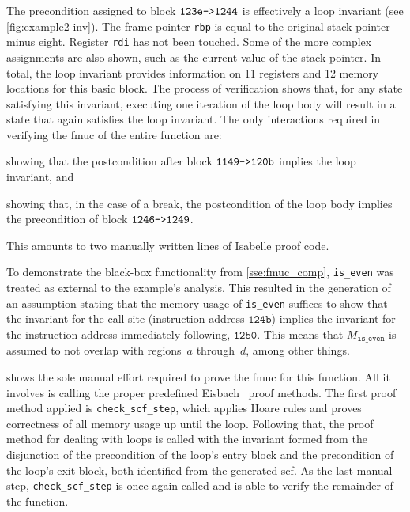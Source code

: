 The precondition assigned to block $\mathtt{123e\texttt{->}1244}$%
is effectively a loop invariant (see \cref{fig:example2-inv}).%
The frame pointer \lstinline|rbp|%
is equal to the original stack pointer minus eight.%
Register \lstinline|rdi| has not been touched.
Some of the more complex assignments are also shown,
such as the current value of the stack pointer.
In total, the loop invariant provides information
on 11 registers and 12 memory locations for this basic block.%
The process of verification shows that,
for any state satisfying this invariant,
executing one iteration of the loop body
will result in a state that again satisfies the loop invariant.
The only interactions required in verifying the \ac{fmuc} of the entire function are:
\begin{enumerate*}
  \item showing that the postcondition after block $\mathtt{1149\texttt{->}120b}$%
  implies the loop invariant, and
  \item showing that, in the case of a break, the postcondition of the loop body%
  implies the precondition of block $\mathtt{1246\texttt{->}1249}$.
\end{enumerate*}
This amounts to two manually written lines of Isabelle proof code.  

To demonstrate the black-box functionality from \cref{sse:fmuc_comp},%
\lstinline|is_even| was treated as external to the example's analysis.
This resulted in the generation of an assumption
stating that the memory usage of \lstinline|is_even| suffices to show that%
the invariant for the call site (instruction address $\mathtt{124b}$)%
implies the invariant for the instruction address immediately following,
$\mathtt{1250}$.
This means that $M_\mathtt{is\_even}$
is assumed to not overlap with regions~$a$ through~$d$, among other things.

 shows the sole manual effort required
to prove the \ac{fmuc} for this function.
All it involves is calling the proper predefined Eisbach~\citep{matichuk2016eisbach}
proof methods.
The first proof method applied is \lstinline|check_scf_step|,
which applies Hoare rules and proves correctness of all memory usage%
%
up until the loop.
Following that, the proof method for dealing with loops
is called with the invariant formed from the disjunction
of the precondition of the loop's entry block
and the precondition of the loop's exit block,
both identified from the generated \ac{scf}.
As the last manual step, \lstinline|check_scf_step| is once again called
and is able to verify the remainder of the function.


